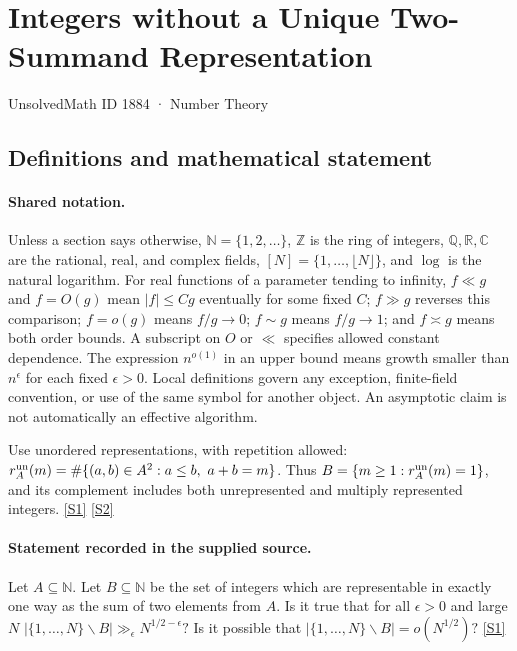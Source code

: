 \documentclass[11pt,a4paper]{article}
\newcommand{\N}{\mathbb{N}}
\newcommand{\Z}{\mathbb{Z}}
\newcommand{\Q}{\mathbb{Q}}
\newcommand{\R}{\mathbb{R}}
\newcommand{\C}{\mathbb{C}}
\newcommand{\sref}[2]{\hyperlink{source:#1:#2}{[S#2]}}
\begin{document}

\setcounter{section}{1883}

\section{Integers without a Unique Two-Summand Representation}\label{1884}

{\small\sffamily UnsolvedMath ID 1884 · Number Theory}

\subsection{Definitions and mathematical statement}

\paragraph{Shared notation.}Unless a section says otherwise, $\N=\{1,2,\ldots\}$,
$\Z$ is the ring of integers, $\Q,\R,\C$ are the rational, real, and complex
fields, $[N]=\{1,\ldots,\lfloor N\rfloor\}$, and $\log$ is the natural
logarithm. For real functions of a parameter tending to infinity,
$f\ll g$ and $f=O(g)$ mean $|f|\leq Cg$ eventually for some fixed $C$;
$f\gg g$ reverses this comparison; $f=o(g)$ means $f/g\to0$;
$f\sim g$ means $f/g\to1$; and $f\asymp g$ means both order bounds.
A subscript on $O$ or $\ll$ specifies allowed constant dependence.
The expression $n^{o(1)}$ in an upper bound means growth smaller than
$n^\epsilon$ for each fixed $\epsilon>0$. Local definitions govern any
exception, finite-field convention, or use of the same symbol for another
object. An asymptotic claim is not automatically an effective algorithm.



Use unordered representations, with repetition allowed: $r_A^{\rm un}(m)=\#\{(a,b)\in A^2:a\leq b,\ a+b=m\}$. Thus $B=\{m\geq1:r_A^{\rm un}(m)=1\}$, and its complement includes both unrepresented and multiply represented integers. \sref{1884}{1} \sref{1884}{2}

\paragraph{Statement recorded in the supplied source.}
Let $A\subseteq \mathbb{N}$. Let $B\subseteq \mathbb{N}$ be the set of integers which are representable in exactly one way as the sum of two elements from $A$.
Is it true that for all $\epsilon>0$ and large $N$ $ \lvert \{1,\ldots,N\}\backslash B\rvert \gg_\epsilon N^{1/2-\epsilon}? $ Is it possible that $ \lvert \{1,\ldots,N\}\backslash B\rvert =o(N^{1/2})? $ \sref{1884}{1}
\end{document}
